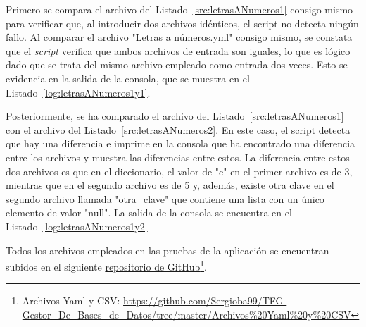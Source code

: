 

Primero se compara el archivo del Listado~\ref{src:letrasANumeros1} consigo mismo para verificar que, al introducir dos archivos idénticos, el script no detecta ningún fallo. Al comparar el archivo "Letras a números.yml" consigo mismo, se constata que el \textit{script} verifica que ambos archivos de entrada son iguales, lo que es lógico dado que se trata del mismo archivo empleado como entrada dos veces. Esto se evidencia en la salida de la consola, que se muestra en el Listado~\ref{log:letrasANumeros1y1}.



Posteriormente, se ha comparado el archivo del Listado~\ref{src:letrasANumeros1} con el archivo del Listado~\ref{src:letrasANumeros2}. En este caso, el script detecta que hay una diferencia e imprime en la consola que ha encontrado una diferencia entre los archivos y muestra las diferencias entre estos. La diferencia entre estos dos archivos es que en el diccionario, el valor de "c" en el primer archivo es de 3, mientras que en el segundo archivo es de 5 y, además, existe otra clave en el segundo archivo llamada "otra\_clave" que contiene una lista con un único elemento de valor "null". La salida de la consola se encuentra en el Listado~\ref{log:letrasANumeros1y2}



Todos los archivos empleados en las pruebas de la aplicación se encuentran subidos en el siguiente \href{https://github.com/Sergioba99/TFG-Gestor_De_Bases_de_Datos/tree/master/Archivos%20Yaml%20y%20CSV}{repositorio de GitHub}\footnote{Archivos Yaml y CSV: \url{https://github.com/Sergioba99/TFG-Gestor\_De\_Bases\_de\_Datos/tree/master/Archivos\%20Yaml\%20y\%20CSV}}. 

